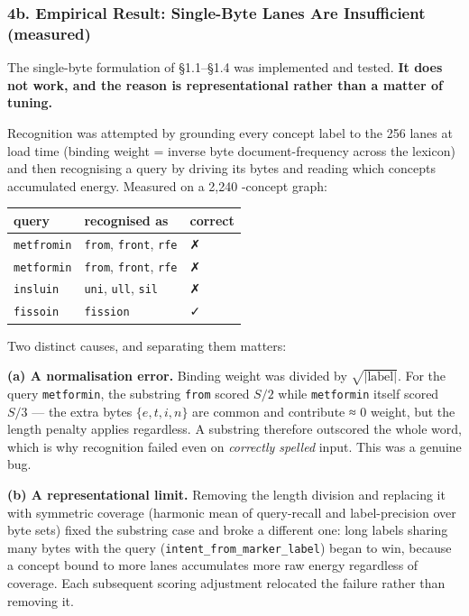 \documentclass[
  11pt,
  a4paper,
]{article}
\begin{document}
\subsubsection{4b. Empirical Result: Single-Byte Lanes Are Insufficient
(measured)}\label{b.-empirical-result-single-byte-lanes-are-insufficient-measured}

The single-byte formulation of §1.1--§1.4 was implemented and tested.
\textbf{It does not work, and the reason is representational rather than
a matter of tuning.}

Recognition was attempted by grounding every concept label to the 256
lanes at load time (binding weight = inverse byte document-frequency
across the lexicon) and then recognising a query by driving its bytes
and reading which concepts accumulated energy. Measured on a 2,240
-concept graph:

\begin{longtable}[]{@{}lll@{}}
\toprule\noalign{}
query & recognised as & correct \\
\midrule\noalign{}
\endhead
\bottomrule\noalign{}
\endlastfoot
\texttt{metfromin} & \texttt{from}, \texttt{front}, \texttt{rfe} & ✗ \\
\texttt{metformin} & \texttt{from}, \texttt{front}, \texttt{rfe} & ✗ \\
\texttt{insluin} & \texttt{uni}, \texttt{ull}, \texttt{sil} & ✗ \\
\texttt{fissoin} & \texttt{fission} & ✓ \\
\end{longtable}

Two distinct causes, and separating them matters:

\textbf{(a) A normalisation error.} Binding weight was divided by
\(\sqrt{|\text{label}|}\). For the query \texttt{metformin}, the
substring \texttt{from} scored \(S/2\) while \texttt{metformin} itself
scored \(S/3\) --- the extra bytes \(\{e,t,i,n\}\) are common and
contribute ≈ 0 weight, but the length penalty applies regardless. A
substring therefore outscored the whole word, which is why recognition
failed even on \emph{correctly spelled} input. This was a genuine bug.

\textbf{(b) A representational limit.} Removing the length division and
replacing it with symmetric coverage (harmonic mean of query-recall and
label-precision over byte sets) fixed the substring case and broke a
different one: long labels sharing many bytes with the query
(\texttt{intent\_from\_marker\_label}) began to win, because a concept
bound to more lanes accumulates more raw energy regardless of coverage.
Each subsequent scoring adjustment relocated the failure rather than
removing it.
\end{document}
